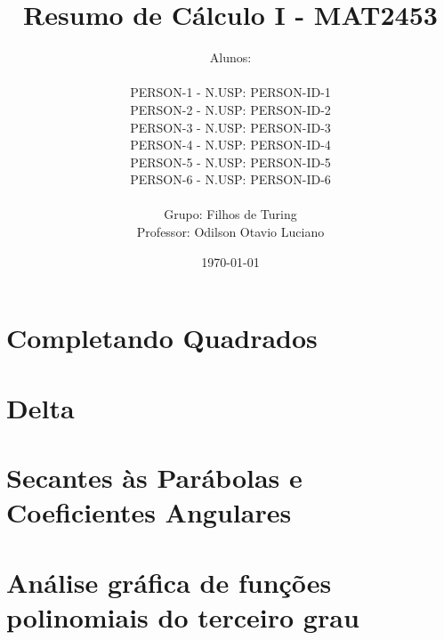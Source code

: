\documentclass[12pt, a4paper]{article}
\title{
	Resumo de Cálculo I - MAT2453
}
\author{
	Alunos:
	\\  
	\\ {{PERSON-1}} - N.USP: {{PERSON-ID-1}}
	\\ {{PERSON-2}} - N.USP: {{PERSON-ID-2}}
	\\ {{PERSON-3}} - N.USP: {{PERSON-ID-3}}
	\\ {{PERSON-4}} - N.USP: {{PERSON-ID-4}}
	\\ {{PERSON-5}} - N.USP: {{PERSON-ID-5}}
	\\ {{PERSON-6}} - N.USP: {{PERSON-ID-6}}
	\\ \\
	Grupo: Filhos de Turing
	\\ Professor: Odilson Otavio Luciano
}
\date{\today}
\begin{document}
	\maketitle
	\thispagestyle{empty}
	\newpage

	\section{Completando Quadrados}

	

	\section{Delta}

	

	\section{Secantes às Parábolas e Coeficientes Angulares}

	

	\section{Análise gráfica de funções polinomiais do terceiro grau}

	
\end{document}
